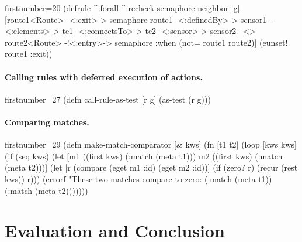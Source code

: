 \documentclass[submission]{eptcs}
\begin{document}
\begin{clojurecode*}{firstnumber=20}
(defrule ^:forall ^:recheck semaphore-neighbor [g]
  [route1<Route> -<:exit>-> semaphore
   route1 -<:definedBy>-> sensor1 -<:elements>-> te1
   -<:connectsTo>-> te2 -<:sensor>-> sensor2
   --<> route2<Route> -!<:entry>-> semaphore
   :when (not= route1 route2)]
  (eunset! route1 :exit))
\end{clojurecode*}


\paragraph{Calling rules with deferred execution of actions.}

\begin{clojurecode*}{firstnumber=27}
(defn call-rule-as-test [r g]
  (as-test (r g)))
\end{clojurecode*}


\paragraph{Comparing matches.}

\begin{clojurecode*}{firstnumber=29}
(defn make-match-comparator [& kws]
  (fn [t1 t2]
    (loop [kws kws]
      (if (seq kws)
        (let [m1 ((first kws) (:match (meta t1)))
              m2 ((first kws) (:match (meta t2)))]
          (let [r (compare (eget m1 :id) (eget m2 :id))]
            (if (zero? r)
              (recur (rest kws))
              r)))
        (errorf "These two matches compare to zero: %
                (:match (meta t1))
                (:match (meta t2)))))))
\end{clojurecode*}

\section{Evaluation and Conclusion}
\label{sec:evaluation}



\end{document}
